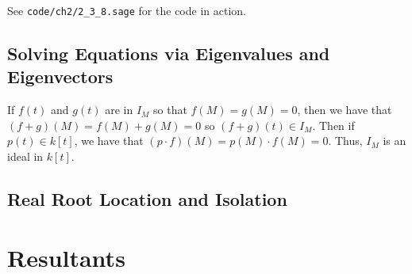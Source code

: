 \documentclass[letterpaper, 11pt, oneside]{book}
\begin{document}
\begin{sol}\label{ex:UAG_2.3.8}
  See \texttt{code/ch2/2\_3\_8.sage} for the code in action.
\end{sol}

\clearpage

\section{Solving Equations via Eigenvalues and Eigenvectors}

\begin{sol}\label{ex:UAG_2.4.2}
  If $f(t)$ and $g(t)$ are in $I_{M}$ so that $f(M) = g(M) = 0$, then we have that $(f + g)(M) = f(M) + g(M) = 0$ so $(f + g)(t) \in I_{M}$.
  Then if $p(t) \in k[t]$, we have that $(p \cdot f)(M) = p(M) \cdot f(M) = 0$.
  Thus, $I_{M}$ is an ideal in $k[t]$.
\end{sol}

\clearpage

\section{Real Root Location and Isolation}

\chapter{Resultants}

\printbibliography
\end{document}
